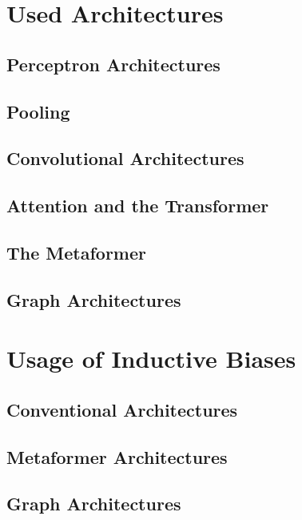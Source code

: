 \documentclass[
headings=optiontohead,              %
12pt,                               %
DIV=13,                             %
twoside=false,                      %
open=right,                         %
BCOR=10mm,                          %
toc=bibliographynumbered            %
]{scrreport}
\begin{document}
    \section{Used Architectures}
        \subsection{Perceptron Architectures}
        \label{sec:architectures-perceptron}
        \subsection{Pooling}
        \label{sec:architectures-pooling}
        \subsection{Convolutional Architectures}
        \label{sec:architectures-convolution}
        \subsection{Attention and the Transformer}
        \label{sec:architectures-attention}
        \subsection{The Metaformer}
        \label{sec:architectures-metaformer}
        \subsection{Graph Architectures}
        \label{sec:architectures-graphs}
    \section{Usage of Inductive Biases}
        \subsection{Conventional Architectures}
        \label{sec:architectures-biasesnormal}
        \subsection{Metaformer Architectures}
        \label{sec:architectures-biasesmetaformer}
        \subsection{Graph Architectures}
        \label{sec:architectures-biasesgraph}
\end{document}
